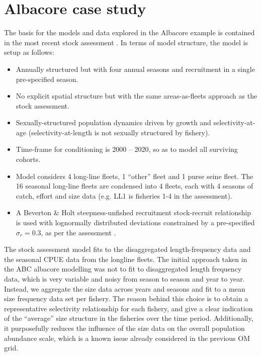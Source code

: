 \documentclass[11pt]{article}
\begin{document}
\section{Albacore case study}

The basis for the models and data explored in the Albacore example is contained in the most recent stock assessment \cite{albsa}. In terms of model structure, the model is setup as follows:

\begin{itemize}
    \item Annually structured but with four annual seasons and recruitment in a single pre-specified season.
    \item No explicit spatial structure but with the same areas-as-fleets approach as the stock assessment.
    \item Sexually-structured population dynamics driven by growth and selectivity-at-age (selectivity-at-length is not sexually structured by fishery).
    \item Time-frame for conditioning is 2000 -- 2020, so as to model all surviving cohorts.
    \item Model considers 4 long-line fleets, 1 ``other'' fleet and 1 purse seine fleet. The 16 seasonal long-line fleets are condensed into 4 fleets, each with 4 seasons of catch, effort and size data (e.g. LL1 is fisheries 1-4 in the assessment).
    \item A Beverton \& Holt steepness-unfished recruitment stock-recruit relationship is used with lognormally distributed deviations constrained by a pre-specified $\sigma_r=0.3$, as per the assessment \cite{albsa}.
\end{itemize}

The stock assessment model fits to the disaggregated length-frequency data and the seasonal CPUE data from the longline fleets. The initial approach taken in the ABC albacore modelling was not to fit to disaggregated length frequency data, which is very variable and noisy from season to season and year to year. Instead, we aggregate the size data across years and seasons and fit to a mean size frequency data set per fishery. The reason behind this choice is to obtain a representative selectivity relationship for each fishery, and give a clear indication of the ``average'' size structure in the fisheries over the time period. Additionally, it purposefully reduces the influence of the size data on the overall population abundance scale, which is a known issue already considered in the previous OM grid.
\end{document}

